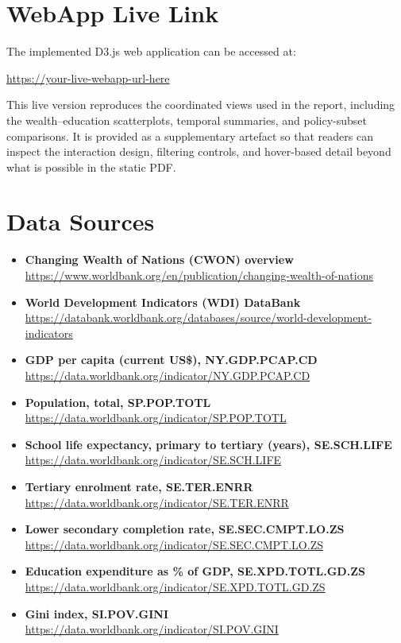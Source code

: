\documentclass{vgtc}
\begin{document}
\section{WebApp Live Link}
\small
The implemented D3.js web application can be accessed at:

\url{https://your-live-webapp-url-here}

This live version reproduces the coordinated views used in the report, including the wealth--education scatterplots, temporal summaries, and policy-subset comparisons. It is provided as a supplementary artefact so that readers can inspect the interaction design, filtering controls, and hover-based detail beyond what is possible in the static PDF.

\section{Data Sources}
\small
\begingroup
\sloppy
\begin{itemize}[leftmargin=*]
  \item \textbf{Changing Wealth of Nations (CWON) overview}\\
  \url{https://www.worldbank.org/en/publication/changing-wealth-of-nations}
  \item \textbf{World Development Indicators (WDI) DataBank}\\
  \url{https://databank.worldbank.org/databases/source/world-development-indicators}
  \item \textbf{GDP per capita (current US\$), NY.GDP.PCAP.CD}\\
  \url{https://data.worldbank.org/indicator/NY.GDP.PCAP.CD}
  \item \textbf{Population, total, SP.POP.TOTL}\\
  \url{https://data.worldbank.org/indicator/SP.POP.TOTL}
  \item \textbf{School life expectancy, primary to tertiary (years), SE.SCH.LIFE}\\
  \url{https://data.worldbank.org/indicator/SE.SCH.LIFE}
  \item \textbf{Tertiary enrolment rate, SE.TER.ENRR}\\
  \url{https://data.worldbank.org/indicator/SE.TER.ENRR}
  \item \textbf{Lower secondary completion rate, SE.SEC.CMPT.LO.ZS}\\
  \url{https://data.worldbank.org/indicator/SE.SEC.CMPT.LO.ZS}
  \item \textbf{Education expenditure as \% of GDP, SE.XPD.TOTL.GD.ZS}\\
  \url{https://data.worldbank.org/indicator/SE.XPD.TOTL.GD.ZS}
  \item \textbf{Gini index, SI.POV.GINI}\\
  \url{https://data.worldbank.org/indicator/SI.POV.GINI}
\end{itemize}
\endgroup
\end{document}
